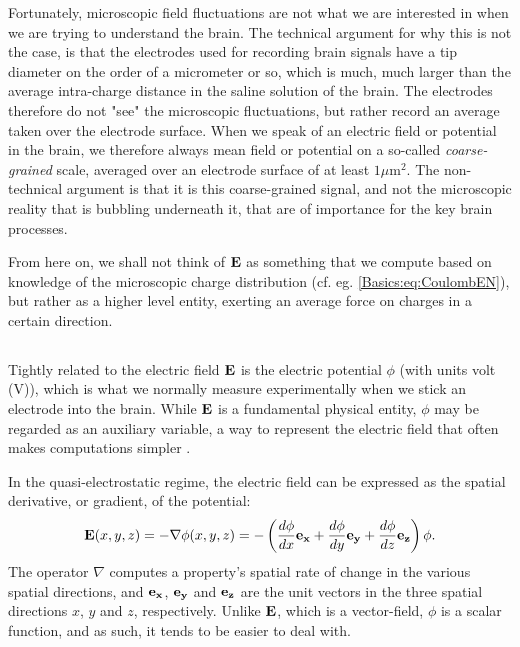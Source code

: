 Fortunately, microscopic field fluctuations are not what we are interested in when we are trying to understand the brain. The technical argument for why this is not the case, is that the electrodes used for recording brain signals have a tip diameter on the order of a micrometer or so, which is much, much larger than the average intra-charge distance in the saline solution of the brain. The electrodes therefore do not "see" the microscopic fluctuations, but rather record an average taken over the electrode surface. When we speak of an electric field or potential in the brain, we therefore always mean field or potential on a so-called \textit{coarse-grained} scale, averaged over an electrode surface of at least $1 \mu$m$^2$. The non-technical argument is that it is this coarse-grained signal, and not the microscopic reality that is bubbling underneath it, that are of importance for the key brain processes. 

From here on, we shall not think of ${\bf E}$ as something that we compute based on
knowledge of the microscopic charge distribution (cf. eg. \ref{Basics:eq:CoulombEN}), but rather as a higher level entity, exerting an average force on charges in a certain direction.


\subsection{}
Tightly related to the electric field ${\bf E}$ is the electric potential $\phi$ (with units volt (V)), which is what we normally measure experimentally when we stick an electrode into the brain. While ${\bf E}$ is a fundamental physical entity, $\phi$ may be regarded as an auxiliary variable, a way to represent the electric field that often makes computations simpler . 


In the quasi-electrostatic regime, the electric field can be expressed as the spatial derivative, or gradient, of the potential:
\begin{equation}
{\bf E}(x,y,z) = - \nabla \phi(x,y,z) = - \left(\frac{d\phi}{dx} {\bf e_x}  + \frac{d\phi}{dy} {\bf e_y} + \frac{d\phi}{dz} {\bf e_z} \right) \phi.
\label{Basics:eq:EV}
\end{equation}
The operator $\nabla$ computes a property's spatial rate of change in the various spatial directions, and ${\bf e_x}$, ${\bf e_y}$ and  ${\bf e_z}$ are the unit vectors in the three spatial directions $x$, $y$ and $z$, respectively. Unlike ${\bf E}$, which is a vector-field, $\phi$ is a scalar function, and as such, it tends to be easier to deal with.

